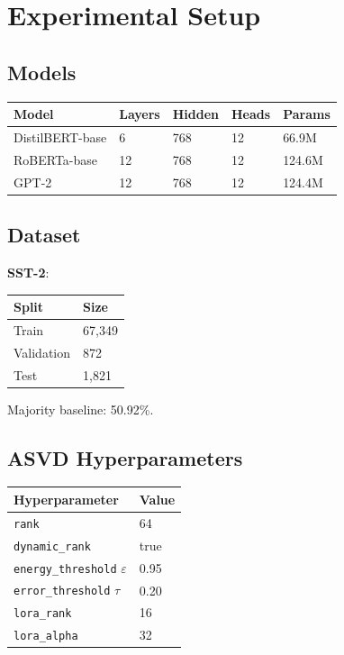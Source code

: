 
\section{Experimental Setup}

\subsection{Models}

\begin{table}[H]
\centering
\small
\begin{tabular}{lllll}
\toprule
\textbf{Model} & \textbf{Layers} & \textbf{Hidden} & \textbf{Heads} & \textbf{Params} \\
\midrule
DistilBERT-base & 6 & 768 & 12 & 66.9M \\
RoBERTa-base & 12 & 768 & 12 & 124.6M \\
GPT-2 & 12 & 768 & 12 & 124.4M \\
\bottomrule
\end{tabular}
\end{table}

\subsection{Dataset}

\textbf{SST-2}:

\begin{table}[H]
\centering
\small
\begin{tabular}{ll}
\toprule
\textbf{Split} & \textbf{Size} \\
\midrule
Train & 67,349 \\
Validation & 872 \\
Test & 1,821 \\
\bottomrule
\end{tabular}
\end{table}

Majority baseline: 50.92\%.

\subsection{ASVD Hyperparameters}

\begin{table}[H]
\centering
\small
\begin{tabular}{ll}
\toprule
\textbf{Hyperparameter} & \textbf{Value} \\
\midrule
\texttt{rank} & 64 \\
\texttt{dynamic\_rank} & true \\
\texttt{energy\_threshold} $\varepsilon$ & 0.95 \\
\texttt{error\_threshold} $\tau$ & 0.20 \\
\texttt{lora\_rank} & 16 \\
\texttt{lora\_alpha} & 32 \\
\bottomrule
\end{tabular}
\end{table}

